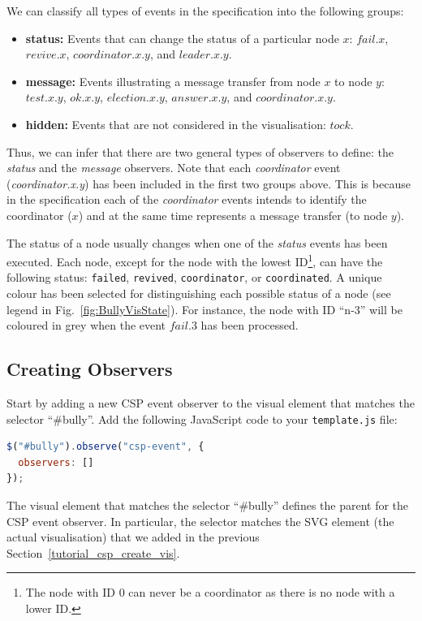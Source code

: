 We can classify all types of events in the specification into the following groups:
\begin{itemize}
\item \textbf{status:} Events that can change the status of a particular node $x$: $fail.x$, $revive.x$, $coordinator.x.y$, and $leader.x.y$.
\item \textbf{message:} Events illustrating a message transfer from node $x$ to node $y$: $test.x.y$, $ok.x.y$, $election.x.y$, $answer.x.y$, and $coordinator.x.y$.
\item \textbf{hidden:} Events that are not considered in the visualisation: $tock$.
\end{itemize}
Thus, we can infer that there are two general types of observers to define: the \textit{status} and the \textit{message} observers.
Note that each \textit{coordinator} event (\textit{coordinator.x.y}) has been included in the first two groups above. 
This is because in the specification each of the \textit{coordinator} events intends to identify the coordinator ($x$) and at the same time represents a message transfer (to node $y$).

The status of a node usually changes when one of the \textit{status} events has been executed.
Each node, except for the node with the lowest ID\footnote{The node with ID 0 can never be a coordinator as there is no node with a lower ID.}, can have the following status: \texttt{failed}, \texttt{revived}, \texttt{coordinator}, or \texttt{coordinated}.
A unique colour has been selected for distinguishing each possible status of a node (see legend in Fig.~\ref{fig:BullyVisState}).
For instance, the node with ID ``n-3'' will be coloured in grey when the event $fail.3$ has been processed.

\subsection{Creating Observers}

Start by adding a new CSP event observer to the visual element that matches the selector ``\#bully''.
Add the following JavaScript code to your \texttt{template.js} file:

\begin{lstlisting}[language=JavaScript]
$("#bully").observe("csp-event", {
  observers: []
});
\end{lstlisting}

The visual element that matches the selector ``\#bully'' defines the parent for the CSP event observer.
In particular, the selector matches the SVG element (the actual visualisation) that we added in the previous Section~\ref{tutorial_csp_create_vis}.

